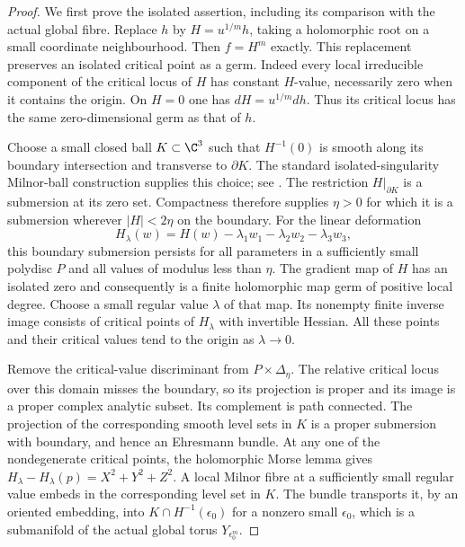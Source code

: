 \begin{proof}
We first prove the isolated assertion, including its
comparison with the actual global fibre. Replace $h$
by $H=u^{1/m}h$, taking a holomorphic root on a small
coordinate neighbourhood. Then $f=H^m$ exactly.
This replacement preserves an isolated critical point
as a germ. Indeed every local irreducible component
of the critical locus of $H$ has constant $H$-value,
necessarily zero when it contains the origin. On
$H=0$ one has $dH=u^{1/m}dh$. Thus its critical
locus has the same zero-dimensional germ as that
of $h$.

Choose a small closed ball $K\subset\C^3$ such that
$H^{-1}(0)$ is smooth along its boundary intersection
and transverse to $\partial K$.
The standard isolated-singularity Milnor-ball
construction supplies this choice; see
\cite[Lemma 6.1 and Appendix B]{Milnor1968}.
The restriction $H|_{\partial K}$ is a submersion
at its zero set. Compactness therefore supplies
$\eta>0$ for which it is a submersion wherever
$|H|<2\eta$ on the boundary. For the linear
deformation
\[
 H_\lambda(w)=H(w)-\lambda_1w_1
                         -\lambda_2w_2-\lambda_3w_3,
                                                        \tag{A.J.38a}\label{cdp:eq:A.J.38a}
\]
this boundary submersion persists for all parameters
in a sufficiently small polydisc $P$ and all values
of modulus less than $\eta$. The gradient map of
$H$ has an isolated zero and consequently is a finite
holomorphic map germ of positive local degree. Choose
a small regular value $\lambda$ of that map. Its
nonempty finite inverse image consists of critical
points of $H_\lambda$ with invertible Hessian. All
these points and their critical values tend to the
origin as $\lambda\to0$.

Remove the critical-value discriminant from
$P\times\Delta_\eta$. The relative critical locus
over this domain misses the boundary, so its
projection is proper and its image is a proper
complex analytic subset. Its complement is path
connected. The projection of the corresponding
smooth level sets in $K$ is a proper submersion
with boundary, and hence an Ehresmann bundle.
At any one of the nondegenerate critical points,
the holomorphic Morse lemma gives
$H_\lambda-H_\lambda(p)=X^2+Y^2+Z^2$.
A local Milnor fibre at a sufficiently small regular
value embeds in the corresponding level set in $K$.
The bundle transports it, by an oriented embedding,
into $K\cap H^{-1}(\epsilon_0)$ for a nonzero small
$\epsilon_0$, which is a submanifold of the actual
global torus $Y_{\epsilon_0^m}$.


\end{proof}
